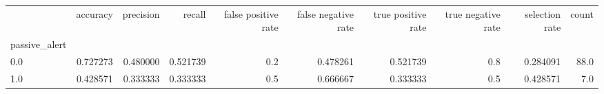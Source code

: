 \begin{tabular}{lrrrrrrrrr}
\toprule
{} &  accuracy &  precision &    recall &  false positive rate &  false negative rate &  true positive rate &  true negative rate &  selection rate &  count \\
passive\_alert &           &            &           &                      &                      &                     &                     &                 &        \\
\midrule
0.0           &  0.727273 &   0.480000 &  0.521739 &                  0.2 &             0.478261 &            0.521739 &                 0.8 &        0.284091 &   88.0 \\
1.0           &  0.428571 &   0.333333 &  0.333333 &                  0.5 &             0.666667 &            0.333333 &                 0.5 &        0.428571 &    7.0 \\
\bottomrule
\end{tabular}
